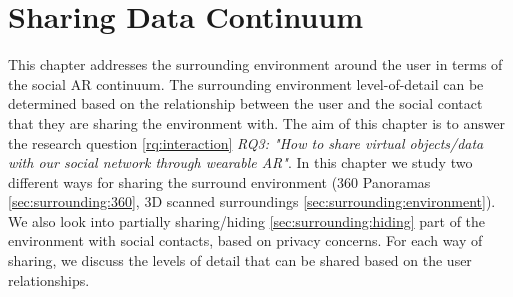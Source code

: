 \chapter{Sharing Data Continuum} %
\label{ch:data} %

This chapter addresses the surrounding environment around the user in terms of the social AR continuum. The surrounding environment level-of-detail can be determined based on the relationship between the user and the social contact that they are sharing the environment with.  The aim of this chapter is to answer the research question \ref{rq:interaction} \textit{RQ3: "How to share virtual objects/data with our social network through wearable AR"}. In this chapter we study two different ways for sharing the surround environment (360 Panoramas \ref{sec:surrounding:360}, 3D scanned surroundings \ref{sec:surrounding:environment}). We also look into partially sharing/hiding \ref{sec:surrounding:hiding} part of the environment with social contacts, based on privacy concerns. For each way of sharing, we discuss the levels of detail that can be shared based on the user relationships. 





